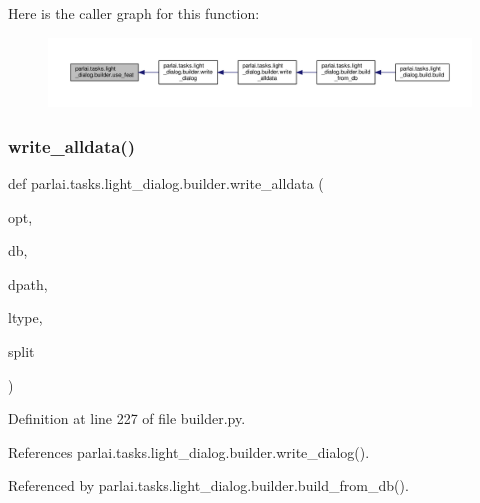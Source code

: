Here is the caller graph for this function\+:
\nopagebreak
\begin{figure}[H]
\begin{center}
\leavevmode
\includegraphics[width=350pt]{namespaceparlai_1_1tasks_1_1light__dialog_1_1builder_ad9de2827ebcf8386662e48c7fe011e43_icgraph}
\end{center}
\end{figure}
\mbox{\label{namespaceparlai_1_1tasks_1_1light__dialog_1_1builder_aeb144d0ebd2fd1727f73677e36f2c8b5}} 
\subsubsection{\texorpdfstring{write\+\_\+alldata()}{write\_alldata()}}
{\footnotesize\ttfamily def parlai.\+tasks.\+light\+\_\+dialog.\+builder.\+write\+\_\+alldata (\begin{DoxyParamCaption}\item[{}]{opt,  }\item[{}]{db,  }\item[{}]{dpath,  }\item[{}]{ltype,  }\item[{}]{split }\end{DoxyParamCaption})}



Definition at line 227 of file builder.\+py.



References parlai.\+tasks.\+light\+\_\+dialog.\+builder.\+write\+\_\+dialog().



Referenced by parlai.\+tasks.\+light\+\_\+dialog.\+builder.\+build\+\_\+from\+\_\+db().

